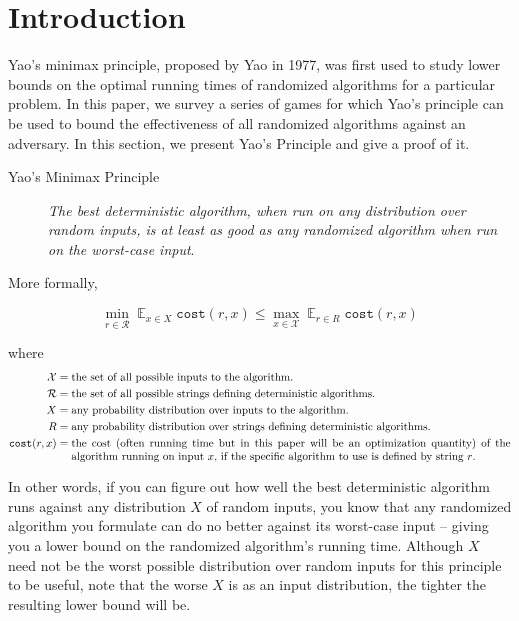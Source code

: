 \newcommand{\Expected}{\mathop{\mathds{E}}}

\section{Introduction}

Yao's minimax principle, proposed by Yao in 1977, was first used to study lower bounds on the optimal running times of randomized algorithms for a particular problem. In this paper, we survey a series of games for which Yao's principle can be used to bound the effectiveness of all randomized algorithms against an adversary.
In this section, we present Yao's Principle and give a proof of it.


\begin{description}
	\item[Yao's Minimax Principle] \emph{The best deterministic algorithm, when run on any distribution over random inputs, is at least as good as any randomized algorithm when run on the worst-case input}.
\end{description}
More formally,

$$\min_{r \in \mathcal{R}} \Expected_{x \in X} \texttt{cost}(r, x) \leq \max_{x \in \mathcal{X}} \Expected_{r \in R} \texttt{cost}(r, x)$$

where \begin{align*}
\mathcal{X} =&\; \text{the set of all possible inputs to the algorithm.}
\\
\mathcal{R} =&\; \text{the set of all possible strings defining deterministic algorithms.}
\\
X =&\; \text{any probability distribution over inputs to the algorithm.}
\\
R =&\; \text{any probability distribution over strings defining deterministic algorithms.}
\\
\texttt{cost}(r, x) =&\; \text{\parbox[t]{5.5in}{the cost (often running time but in this paper will be an optimization quantity) of the algorithm running on input $x$, if the specific algorithm to use is defined by string $r$.}}
\end{align*}

In other words, if you can figure out how well the best deterministic algorithm runs against any distribution $X$ of random inputs, you know that any randomized algorithm you formulate can do no better against its worst-case input -- giving you a lower bound on the randomized algorithm's running time.
Although $X$ need not be the worst possible distribution over random inputs for this principle to be useful, note that the worse $X$ is as an input distribution, the tighter the resulting lower bound will be. 

